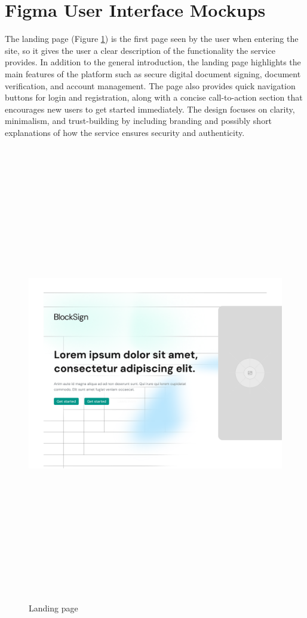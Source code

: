 \newpage
\section{Figma User Interface Mockups}

The landing page (Figure \ref{landing1}) is the first page seen by the user when entering the site, so it gives the user a clear description of the functionality the service provides. 
In addition to the general introduction, the landing page highlights the main features of the platform such as secure digital document signing, document verification, and account management. 
The page also provides quick navigation buttons for login and registration, along with a concise call-to-action section that encourages new users to get started immediately. 
The design focuses on clarity, minimalism, and trust-building by including branding and possibly short explanations of how the service ensures security and authenticity.

\begin{figure}[H]
    \centering
    \includegraphics[width=18cm, height=20cm, keepaspectratio]{"images/figmaUI/landing-top.png"}
    \caption{Landing page}
    \label{landing1}
\end{figure}

